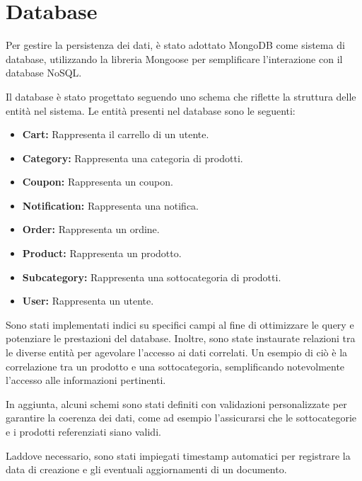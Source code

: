 \section{Database}
Per gestire la persistenza dei dati, è stato adottato MongoDB come sistema di database, utilizzando la libreria Mongoose per semplificare l'interazione con il database NoSQL.

Il database è stato progettato seguendo uno schema che riflette la struttura delle entità nel sistema.
Le entità presenti nel database sono le seguenti:
\begin{itemize}
    \item \textbf{Cart:} Rappresenta il carrello di un utente.
    \item \textbf{Category:} Rappresenta una categoria di prodotti.
    \item \textbf{Coupon:} Rappresenta un coupon.
    \item \textbf{Notification:} Rappresenta una notifica.
    \item \textbf{Order:} Rappresenta un ordine.
    \item \textbf{Product:} Rappresenta un prodotto.
    \item \textbf{Subcategory:} Rappresenta una sottocategoria di prodotti.
    \item \textbf{User:} Rappresenta un utente.
\end{itemize}

Sono stati implementati indici su specifici campi al fine di ottimizzare le query e potenziare le prestazioni del database. Inoltre, sono state instaurate relazioni tra le diverse entità per agevolare l'accesso ai dati correlati. Un esempio di ciò è la correlazione tra un prodotto e una sottocategoria, semplificando notevolmente l'accesso alle informazioni pertinenti.

In aggiunta, alcuni schemi sono stati definiti con validazioni personalizzate per garantire la coerenza dei dati, come ad esempio l'assicurarsi che le sottocategorie e i prodotti referenziati siano validi.

Laddove necessario, sono stati impiegati timestamp automatici per registrare la data di creazione e gli eventuali aggiornamenti di un documento.
